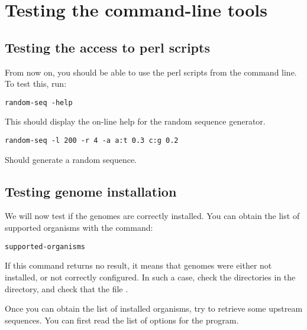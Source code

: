 \documentclass{book}
\begin{document}





\chapter{Testing the command-line tools}

\section{Testing the access to perl scripts}

From now on, you should be able to use the perl scripts from the
command line. To test this, run: 

\begin{verbatim}
random-seq -help
\end{verbatim}

This should display the on-line help for the random sequence
generator. 

\begin{verbatim}
random-seq -l 200 -r 4 -a a:t 0.3 c:g 0.2
\end{verbatim}

Should generate a random sequence.

\section{Testing genome installation}

We will now test if the genomes are correctly installed. You can
obtain the list of supported organisms with the command:

\begin{verbatim}
supported-organisms
\end{verbatim}

If this command returns no result, it means that genomes were either
not installed, or not correctly configured. In such a case, check the
directories in the  directory, and check that the
file .

Once you can obtain the list of installed organisms, try to retrieve
some upstream sequences. You can first read the list of options for the
 program.
\end{document}
